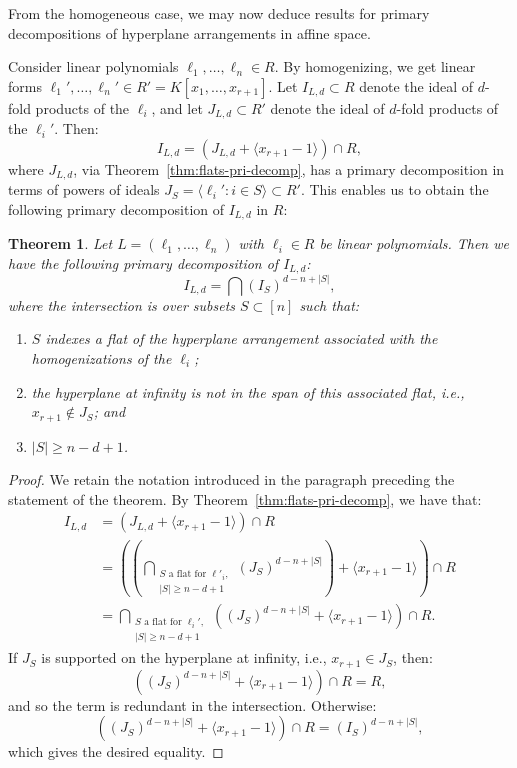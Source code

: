 \documentclass [a4paper,reqno, 11pt]{amsart}
\theoremstyle{plain}
\newtheorem{theorem}{Theorem}[section]
\theoremstyle{plain}
\theoremstyle{plain}
\theoremstyle{plain}
\theoremstyle{definition}
\theoremstyle{definition}
\theoremstyle{definition}
\theoremstyle{definition}
\theoremstyle{definition}
\theoremstyle{definition}
\begin{document}
From the homogeneous case, we may now deduce results for primary decompositions of hyperplane arrangements in affine space.

Consider linear polynomials $\ell_1,\ldots,\ell_n\in R$. By homogenizing, we get linear forms $\ell_1',\ldots,\ell_n'\in R'=K[x_1,\ldots,x_{r+1}]$. Let $I_{L,d}\subset R$ denote the ideal of $d$-fold products of the $\ell_i$, and let $J_{L,d}\subset R'$ denote the ideal of $d$-fold products of the $\ell_i'$. Then: 
\[I_{L,d}=(J_{L,d}+\langle x_{r+1}-1\rangle)\cap R,\]
where $J_{L,d}$, via Theorem~\ref{thm:flats-pri-decomp}, has a primary decomposition in terms of powers of ideals $J_S=\langle \ell_i':i\in S\rangle\subset R'$.
This enables us to obtain the following primary decomposition of $I_{L,d}$ in $R$:

\begin{theorem}\label{thm:affine-pri-decomp}
    Let $L=(\ell_1,\ldots,\ell_n)$ with $\ell_i\in R$ be linear polynomials. Then we have the following primary decomposition of $I_{L,d}$:
    \[I_{L,d}=\bigcap (I_S)^{d-n+|S|},\]
    where the intersection is over subsets $S\subset[n]$ such that: 
    \begin{enumerate}
        \item $S$ indexes a flat of the hyperplane arrangement associated with the homogenizations of the $\ell_i$;
        \item the hyperplane at infinity is not in the span of this associated flat, i.e., $x_{r+1}\notin J_S$; and
        \item $|S|\geq n-d+1$.
    \end{enumerate}
\end{theorem}

\begin{proof}
    We retain the notation introduced in the paragraph preceding the statement of the theorem. By Theorem~\ref{thm:flats-pri-decomp}, we have that:
    \begin{align*}
        I_{L,d} &= (J_{L,d}+\langle x_{r+1}-1\rangle)\cap R\\
        &=\left(\left(\bigcap_{\substack{\text{$S$ a flat for $\ell'_i$},\\|S|\geq n-d+1}} (J_S)^{d-n+|S|}\right)+\langle x_{r+1}-1\rangle\right)\cap R\\
        &=\bigcap_{\substack{\text{$S$ a flat for $\ell_i'$},\\|S|\geq n-d+1}}\left((J_S)^{d-n+|S|}+\langle x_{r+1}-1\rangle\right)\cap R.
    \end{align*}
    If $J_S$ is supported on the hyperplane at infinity, i.e., $x_{r+1}\in J_S$, then: 
    \[\left((J_S)^{d-n+|S|}+\langle x_{r+1}-1\rangle\right)\cap R=R,\]
    and so the term is redundant in the intersection. Otherwise:
    \[\left((J_S)^{d-n+|S|}+\langle x_{r+1}-1\rangle\right)\cap R=(I_S)^{d-n+|S|},\]
    which gives the desired equality.
\end{proof}
\end{document}
